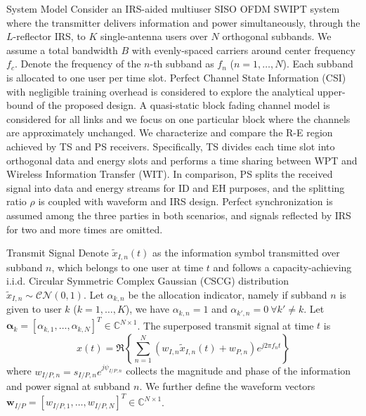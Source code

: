 \documentclass{IEEEtran}
\begin{document}
\begin{section}{System Model}
	Consider an IRS-aided multiuser SISO OFDM SWIPT system where the transmitter delivers information and power simultaneously, through the $L$-reflector IRS, to $K$ single-antenna users over $N$ orthogonal subbands. We assume a total bandwidth $B$ with evenly-spaced carriers around center frequency $f_c$. Denote the frequency of the $n$-th subband as $f_n$ ($n=1,\dots,N$). Each subband is allocated to one user per time slot. Perfect Channel State Information (CSI) with negligible training overhead is considered to explore the analytical upper-bound of the proposed design. A quasi-static block fading channel model is considered for all links and we focus on one particular block where the channels are approximately unchanged. We characterize and compare the R-E region achieved by TS and PS receivers. Specifically, TS divides each time slot into orthogonal data and energy slots and performs a time sharing between WPT and Wireless Information Transfer (WIT). In comparison, PS splits the received signal into data and energy streams for ID and EH purposes, and the splitting ratio $\rho$ is coupled with waveform and IRS design. Perfect synchronization is assumed among the three parties in both scenarios, and signals reflected by IRS for two and more times are omitted.
	\begin{subsection}{Transmit Signal}
		Denote $\tilde{x}_{I,n}(t)$ as the information symbol transmitted over subband $n$, which belongs to one user at time $t$ and follows a capacity-achieving i.i.d. Circular Symmetric Complex Gaussian (CSCG) distribution $\tilde{x}_{I,n}\sim\mathcal{CN}(0,1)$. Let $\alpha_{k,n}$ be the allocation indicator, namely if subband $n$ is given to user $k$ ($k=1,\dots,K$), we have $\alpha_{k,n}=1$ and $\alpha_{k',n}=0 \ \forall k' \ne k$. Let $\boldsymbol{\alpha}_k=[\alpha_{k,1},\dots,\alpha_{k,N}]^T \in \mathbb{C}^{N \times 1}$. The superposed transmit signal at time $t$ is
		\begin{equation}\label{eq:x}
			x(t)=\Re\left\{\sum_{n=1}^N\left({w_{I,n}\tilde{x}_{I,n}(t)}+w_{P,n}\right){e^{j2{\pi}{f_n}{t}}}\right\}
		\end{equation}
		where $w_{I/P,n}=s_{I/P,n}e^{j\psi_{I/P,n}}$ collects the magnitude and phase of the information and power signal at subband $n$. We further define the waveform vectors $\boldsymbol{w}_{I/P}=[w_{I/P,1},\dots,w_{I/P,N}]^T \in \mathbb{C}^{N{\times}1}$.
	\end{subsection}


\end{section}
\end{document}
